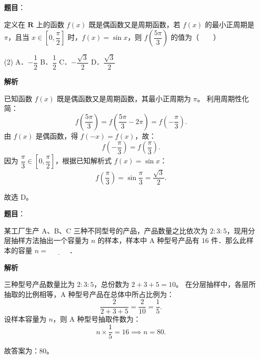 \begin{answer}

\textbf{题目}：

定义在 $\mathbf{R}$ 上的函数 $f(x)$ 既是偶函数又是周期函数，若 $f(x)$ 的最小正周期是 $\pi$，且当 $x \in \left[0, \dfrac{\pi}{2}\right]$ 时，$f(x) = \sin x$，则 $f\left(\dfrac{5\pi}{3}\right)$ 的值为\mbox{（　　）}

\begin{gkopts}(2)
\task A．$-\dfrac{1}{2}$
\task B．$\dfrac{1}{2}$
\task C．$-\dfrac{\sqrt{3}}{2}$
\task D．$\dfrac{\sqrt{3}}{2}$
\end{gkopts}

\textbf{解析}

已知函数 $f(x)$ 既是偶函数又是周期函数，其最小正周期为 $\pi$。
利用周期性化简：
\nopagebreak[4]
\[
f\left(\dfrac{5\pi}{3}\right) = f\left(\dfrac{5\pi}{3} - 2\pi\right) = f\left(-\dfrac{\pi}{3}\right).
\]
由 $f(x)$ 是偶函数，得 $f(-x) = f(x)$，故：
\nopagebreak[4]
\[
f\left(-\dfrac{\pi}{3}\right) = f\left(\dfrac{\pi}{3}\right).
\]
因为 $\dfrac{\pi}{3} \in \left[0, \dfrac{\pi}{2}\right]$，根据已知解析式 $f(x) = \sin x$：
\nopagebreak[4]
\[
f\left(\dfrac{\pi}{3}\right) = \sin\dfrac{\pi}{3} = \dfrac{\sqrt{3}}{2}.
\]

故选 D。


\end{answer}
\begin{answer}

\textbf{题目}：

某工厂生产 A、B、C 三种不同型号的产品，产品数量之比依次为 $2 : 3 : 5$，现用分层抽样方法抽出一个容量为 $n$ 的样本，样本中 A 种型号产品有 16 件．那么此样本的容量 $n = \underline{\hspace{3em}}$．

\textbf{解析}

三种型号产品数量比为 $2 : 3 : 5$，总份数为 $2 + 3 + 5 = 10$。
在分层抽样中，各层所抽取的比例相等，A 种型号产品在总体中所占比例为：
\nopagebreak[4]
\[
\dfrac{2}{2 + 3 + 5} = \dfrac{2}{10} = \dfrac{1}{5}.
\]
设样本容量为 $n$，则 A 种型号抽取件数为：
\nopagebreak[4]
\[
n \times \dfrac{1}{5} = 16 \implies n = 80.
\]

故答案为：80。


\end{answer}
